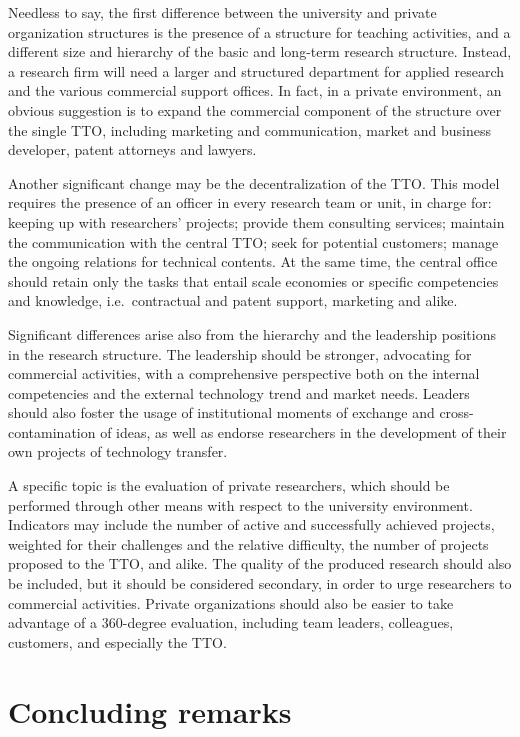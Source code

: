 Needless to say, the first difference between the university and private organization structures is the presence of a structure for teaching activities, and a different size and hierarchy of the basic and long-term research structure. Instead, a research firm will need a larger and structured department for applied research and the various commercial support offices. In fact, in a private environment, an obvious suggestion is to expand the commercial component of the structure over the single TTO, including marketing and communication, market and business developer, patent attorneys and lawyers.

Another significant change may be the decentralization of the TTO. This model requires the presence of an officer in every research team or unit, in charge for: keeping up with researchers' projects; provide them consulting services; maintain the communication with the central TTO; seek for potential customers; manage the ongoing relations for technical contents. At the same time, the central office should retain only the tasks that entail scale economies or specific competencies and knowledge, i.e.\ contractual and patent support, marketing and alike.

Significant differences arise also from the hierarchy and the leadership positions in the research structure. The leadership should be stronger, advocating for commercial activities, with a comprehensive perspective both on the internal competencies and the external technology trend and market needs. Leaders should also foster the usage of institutional moments of exchange and cross-contamination of ideas, as well as endorse researchers in the development of their own projects of technology transfer.

A specific topic is the evaluation of private researchers, which should be performed through other means with respect to the university environment. Indicators may include the number of active and successfully achieved projects, weighted for their challenges and the relative difficulty, the number of projects proposed to the TTO, and alike. The quality of the produced research should also be included, but it should be considered secondary, in order to urge researchers to commercial activities. Private organizations should also be easier to take advantage of a 360-degree evaluation, including team leaders, colleagues, customers, and especially the TTO. 

\section{Concluding remarks}

